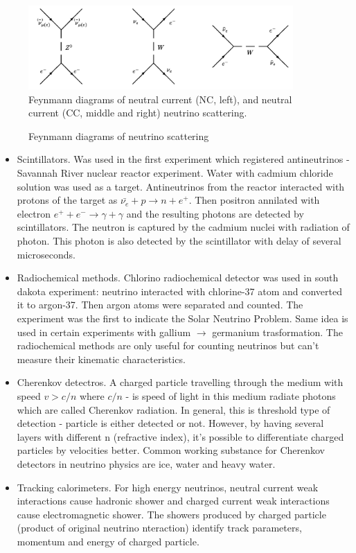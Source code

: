 \begin{figure}
\caption{Feynmann diagrams of neutrino scattering}
\label{fig:MuonAndNeutronDecays}
\centering
\includegraphics[width=0.9\textwidth, keepaspectratio=true]{figs/neutrinoScattering.png}
\\Feynmann diagrams of neutral current (NC, left), and neutral current (CC, middle and right) neutrino scattering.
\end{figure}
\begin{itemize}

  \item Scintillators. Was used in the first experiment which registered antineutrinos - Savannah River nuclear reactor experiment. Water with cadmium chloride solution was used as a target. Antineutrinos from the reactor interacted with protons of the target as $\bar{\nu_e}+p \rightarrow n+e^+$. Then positron annilated with electron $e^+ + e^- \rightarrow \gamma + \gamma$ and the resulting photons are detected by scintillators. The neutron is captured by the cadmium nuclei with radiation of photon. This photon is also detected by the scintillator with delay of several microseconds. 
  \item Radiochemical methods. Chlorino radiochemical detector was used in south dakota experiment: neutrino interacted with chlorine-37 atom and converted it to argon-37. Then argon atoms were separated and counted. The experiment was the first to indicate the Solar Neutrino Problem. Same idea is used in certain experiments with gallium $\rightarrow$ germanium trasformation. The radiochemical methods are only useful for counting neutrinos but can't measure their kinematic characteristics.
  \item Cherenkov detectros. A charged particle travelling through the medium with speed $v>c/n$ where $c/n$ - is speed of light in this medium radiate photons which are called Cherenkov radiation. In general, this is threshold type of detection - particle is either detected or not. However, by having several layers with different n (refractive index), it's possible to differentiate charged particles by velocities better. Common working substance for Cherenkov detectors in neutrino physics are ice, water and heavy water.
  \item Tracking calorimeters. For high energy neutrinos, neutral current weak interactions cause hadronic shower and charged current weak interactions cause electromagnetic shower. The showers produced by charged particle (product of original neutrino nteraction) identify track parameters, momentum and energy of charged particle.
\end{itemize}


